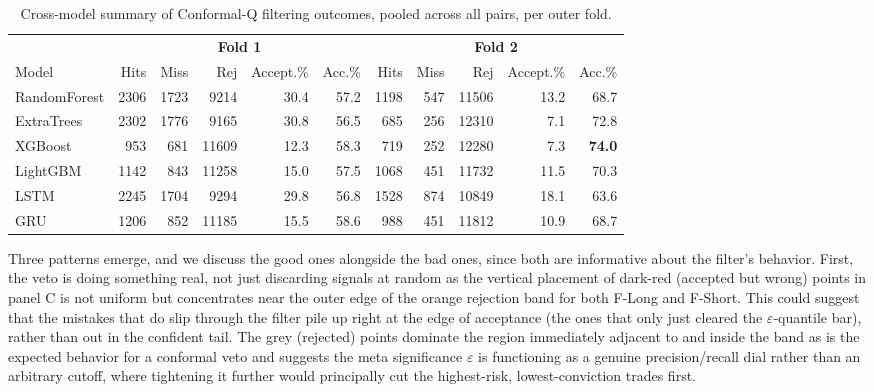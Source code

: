 \documentclass[12pt, a4paper]{article}
\begin{document}
\begin{table}[H]
\centering
\small
\begin{tabular}{l|rrr|r|r||rrr|r|r}
\toprule
 & \multicolumn{5}{c||}{\textbf{Fold 1}} & \multicolumn{5}{c}{\textbf{Fold 2}} \\
Model & Hits & Miss & Rej & Accept.\% & Acc.\% & Hits & Miss & Rej & Accept.\% & Acc.\% \\
\midrule
RandomForest & 2306 & 1723 & 9214  & 30.4 & 57.2 & 1198 & 547 & 11506 & 13.2 & 68.7 \\
ExtraTrees   & 2302 & 1776 & 9165  & 30.8 & 56.5 & 685  & 256 & 12310 & 7.1  & 72.8 \\
XGBoost      & 953  & 681  & 11609 & 12.3 & 58.3 & 719  & 252 & 12280 & 7.3  & \textbf{74.0} \\
LightGBM     & 1142 & 843  & 11258 & 15.0 & 57.5 & 1068 & 451 & 11732 & 11.5 & 70.3 \\
LSTM         & 2245 & 1704 & 9294  & 29.8 & 56.8 & 1528 & 874 & 10849 & 18.1 & 63.6 \\
GRU          & 1206 & 852  & 11185 & 15.5 & 58.6 & 988  & 451 & 11812 & 10.9 & 68.7 \\
\bottomrule
\end{tabular}
\caption{Cross-model summary of Conformal-Q filtering outcomes, pooled across all pairs, per outer fold.}
\label{tab:conformal_tournament_summary}
\end{table}

Three patterns emerge, and we discuss the good ones alongside the bad ones, since both are informative about the filter's behavior.
First, the veto is doing something real, not just discarding signals at random as the vertical placement of dark-red (accepted but wrong) points in panel C is not uniform but 
concentrates near the outer edge of the orange rejection band for both F-Long and F-Short. This could suggest that the mistakes that do slip through the filter 
pile up right at the edge of acceptance (the ones that only just cleared the $\varepsilon$-quantile bar), rather than out in the confident tail.
The grey (rejected) points dominate the region immediately adjacent to and inside the band as is the 
expected behavior for a conformal veto and suggests the meta significance $\varepsilon$ is functioning as a genuine precision/recall dial rather than an arbitrary cutoff, where 
tightening it further would principally cut the highest-risk, lowest-conviction trades first.

\medskip
\end{document}
